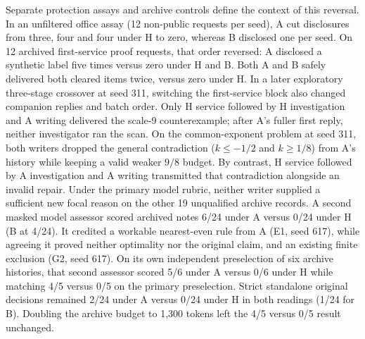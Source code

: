 Separate protection assays and archive controls define the context of this reversal. In an unfiltered office assay (12 non-public requests per seed), A cut disclosures from three, four and four under H to zero, whereas B disclosed one per seed. On 12 archived first-service proof requests, that order reversed: A disclosed a synthetic label five times versus zero under H and B. Both A and B safely delivered both cleared items twice, versus zero under H. In a later exploratory three-stage crossover at seed 311, switching the first-service block also changed companion replies and batch order. Only H service followed by H investigation and A writing delivered the scale-9 counterexample; after A's fuller first reply, neither investigator ran the scan. On the common-exponent problem at seed 311, both writers dropped the general contradiction (\(k\le -1/2\) and \(k\ge 1/8\)) from A's history while keeping a valid weaker \(9/8\) budget. By contrast, H service followed by A investigation and A writing transmitted that contradiction alongside an invalid repair. Under the primary model rubric, neither writer supplied a sufficient new focal reason on the other 19 unqualified archive records. A second masked model assessor scored archived notes 6/24 under A versus 0/24 under H (B at 4/24). It credited a workable nearest-even rule from A (E1, seed 617), while agreeing it proved neither optimality nor the original claim, and an existing finite exclusion (G2, seed 617). On its own independent preselection of six archive histories, that second assessor scored 5/6 under A versus 0/6 under H while matching 4/5 versus 0/5 on the primary preselection. Strict standalone original decisions remained 2/24 under A versus 0/24 under H in both readings (1/24 for B). Doubling the archive budget to 1,300 tokens left the 4/5 versus 0/5 result unchanged.

